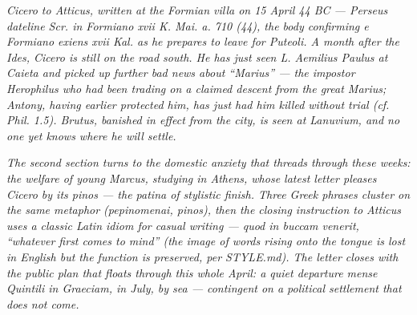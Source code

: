 
\textit{Cicero to Atticus, written at the Formian villa on 15
April 44 BC --- Perseus dateline \textit{Scr. in Formiano xvii
K. Mai. a. 710 (44)}, the body confirming \textit{e Formiano
exiens xvii Kal.} as he prepares to leave for Puteoli. A month
after the Ides, Cicero is still on the road south. He has just
seen L. Aemilius Paulus at Caieta and picked up further bad news
about ``Marius'' --- the impostor Herophilus who had been
trading on a claimed descent from the great Marius; Antony,
having earlier protected him, has just had him killed without
trial (cf. \textit{Phil.} 1.5). Brutus, banished in effect from
the city, is seen at Lanuvium, and no one yet knows where he
will settle.}

\textit{The second section turns to the domestic anxiety that
threads through these weeks: the welfare of young Marcus,
studying in Athens, whose latest letter pleases Cicero by its
\textit{pinos} --- the patina of stylistic finish. Three Greek
phrases cluster on the same metaphor (\textit{pepinomenai},
\textit{pinos}), then the closing instruction to Atticus uses a
classic Latin idiom for casual writing --- \textit{quod in
buccam venerit}, ``whatever first comes to mind'' (the image of
words rising onto the tongue is lost in English but the function
is preserved, per STYLE.md). The letter closes with the public
plan that floats through this whole April: a quiet departure
\textit{mense Quintili in Graeciam}, in July, by sea ---
contingent on a political settlement that does not come.}
